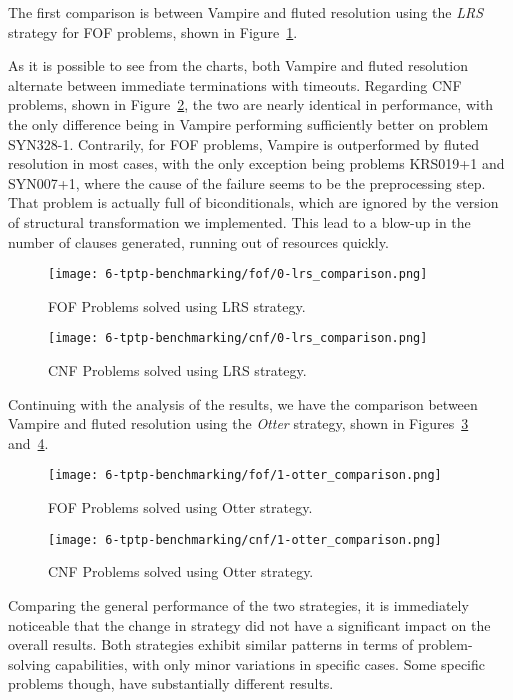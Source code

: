 The first comparison is between Vampire and fluted resolution using the \emph{LRS} strategy for FOF problems, shown in Figure~\ref{fig:fof-lrs}.

As it is possible to see from the charts, both Vampire and fluted resolution alternate between immediate terminations with timeouts.
Regarding CNF problems, shown in Figure~\ref{fig:cnf-lrs}, the two are nearly identical in performance, with the only difference being in Vampire performing sufficiently better on problem SYN328-1. %
Contrarily, for FOF problems, Vampire is outperformed by fluted resolution in most cases, with the only exception being problems KRS019+1 and SYN007+1, where the cause of the failure seems to be the preprocessing step.
That problem is actually full of biconditionals, which are ignored by the version of structural transformation we implemented. This lead to a blow-up in the number of clauses generated, running out of resources quickly.
\begin{figure}[H]
  \centering
  \texttt{[image: 6-tptp-benchmarking/fof/0-lrs\_comparison.png]}
  \caption{FOF Problems solved using LRS strategy.}\label{fig:fof-lrs}
\end{figure}

\begin{figure}[H]
  \centering
  \texttt{[image: 6-tptp-benchmarking/cnf/0-lrs\_comparison.png]}
  \caption{CNF Problems solved using LRS strategy.}\label{fig:cnf-lrs}
\end{figure}



Continuing with the analysis of the results, we have the comparison between Vampire and fluted resolution using the \emph{Otter} strategy, shown in Figures~\ref{fig:fof-otter} and~\ref{fig:cnf-otter}.

\begin{figure}[H]
  \centering
  \texttt{[image: 6-tptp-benchmarking/fof/1-otter\_comparison.png]}
  \caption{FOF Problems solved using Otter strategy.}\label{fig:fof-otter}
\end{figure}

\begin{figure}[H]
  \centering
  \texttt{[image: 6-tptp-benchmarking/cnf/1-otter\_comparison.png]}
  \caption{CNF Problems solved using Otter strategy.}\label{fig:cnf-otter}
\end{figure}

Comparing the general performance of the two strategies, it is immediately noticeable that the change in strategy did not have a significant impact on the overall results. Both strategies exhibit similar patterns in terms of problem-solving capabilities, with only minor variations in specific cases.
Some specific problems though, have substantially different results.

